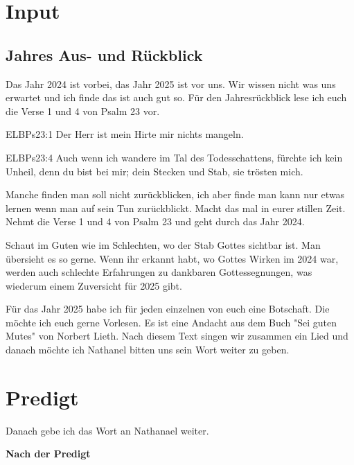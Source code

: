 \documentclass{../inc/mybib}
\begin{document}
\section{ Input }
\begin{spacing}{1.5}
\subsection{ Jahres Aus- und Rückblick}

Das Jahr 2024 ist vorbei, das Jahr 2025 ist vor uns. Wir wissen nicht was uns erwartet und ich finde das ist auch gut so. Für den Jahresrückblick lese ich euch die Verse 1 und 4 von Psalm 23 vor.

\begin{bibelbox}{ELB}{Ps}{23:1}
Der Herr ist mein Hirte mir nichts mangeln.
\end{bibelbox}
\begin{bibelbox}{ELB}{Ps}{23:4}
Auch wenn ich wandere im Tal des Todesschattens, fürchte ich kein Unheil, denn du bist bei mir; dein Stecken und Stab, sie trösten mich.
\end{bibelbox}

Manche finden man soll nicht zurückblicken, ich aber finde man kann nur etwas lernen wenn man auf sein Tun zurückblickt. Macht das mal in eurer stillen Zeit. Nehmt die Verse 1 und 4 von Psalm 23 und geht durch das Jahr 2024. 

Schaut im Guten wie im Schlechten, wo der Stab Gottes sichtbar ist. Man übersieht es so gerne. Wenn ihr erkannt habt, wo Gottes Wirken im 2024 war, werden auch schlechte Erfahrungen zu dankbaren Gottessegnungen, was wiederum einem Zuversicht für 2025 gibt.

Für das Jahr 2025 habe ich für jeden einzelnen von euch eine Botschaft. Die möchte ich euch gerne Vorlesen. Es ist eine Andacht aus dem Buch "Sei guten Mutes" von Norbert Lieth.
Nach diesem Text singen wir zusammen ein Lied und danach möchte ich Nathanel bitten uns sein Wort weiter zu geben.

\end{spacing}


\section{Predigt}

Danach gebe ich das Wort an Nathanael weiter.

\textbf{Nach der Predigt}
\end{document}
